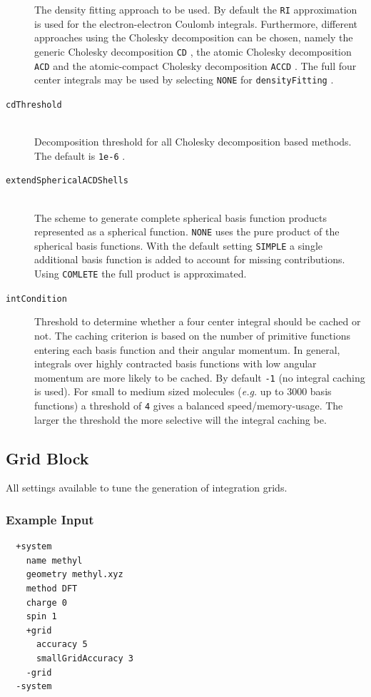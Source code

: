 \documentclass[bibliography=totocnumbered,a4paper,10pt,oneside]{scrbook}
\newcommand{\ttt}[1]{%
  \begingroup\setlength{\fboxsep}{1pt}%
  \colorbox{serenity-green!30}{\texttt{\hspace*{2pt}\vphantom{(g}#1\hspace*{2pt}}}%
  \endgroup
}
\begin{document}
\begin{description}
    The density fitting approach to be used. By default the \ttt{RI} approximation is used for the electron-electron
    Coulomb integrals. Furthermore, different approaches using the Cholesky decomposition can be chosen, namely the generic Cholesky decomposition \ttt{CD}, the atomic Cholesky decomposition \ttt{ACD} and the atomic-compact Cholesky decomposition \ttt{ACCD}. The full four center integrals may be used by selecting \ttt{NONE} for \ttt{densityFitting}. 
    \item [\texttt{cdThreshold}]\hfill\\
    Decomposition threshold for all Cholesky decomposition based methods. The default is \ttt{1e-6}.
    \item [\texttt{extendSphericalACDShells}]\hfill\\
    The scheme to generate complete spherical basis function products represented as a spherical function. \ttt{NONE} uses the pure product of the spherical basis functions. With the default setting \ttt{SIMPLE} a single additional basis function is added to account for missing contributions. Using \ttt{COMLETE} the full product is approximated.
    \item[\texttt{intCondition}]
    Threshold to determine whether a four center integral should be cached or not.
    The caching criterion is based on the number of primitive  functions entering each basis function and their angular
    momentum. In general, integrals over highly contracted basis functions with low angular momentum are more likely to
    be cached. By default \ttt{-1} (no integral caching is used). For small to medium sized molecules
    (\emph{e.g.} up to 3000 basis functions) a threshold of \ttt{4} gives a balanced speed/memory-usage. The larger the
    threshold the more selective will the integral caching be.
 \end{description}

\subsection{Grid Block}\label{sec:system:grid}
All settings available to tune the generation of integration grids.
\subsubsection{Example Input}
\begin{lstlisting}
  +system
    name methyl
    geometry methyl.xyz
    method DFT
    charge 0
    spin 1
    +grid
      accuracy 5
      smallGridAccuracy 3
    -grid
  -system
 \end{lstlisting}
\end{document}
